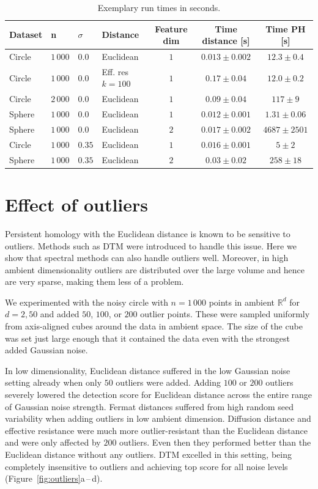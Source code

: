 \documentclass{article}
\theoremstyle{plain}
\theoremstyle{definition}
\theoremstyle{remark}
\begin{document}
\begin{table}[t]
    \centering
    \caption{Exemplary run times in seconds.}
    \begin{tabular}{llllccc}
        \toprule
         Dataset& n&$\sigma$& Distance & Feature dim& Time distance [s] & Time PH [s]\\
         \midrule
         Circle &$1\,000$ & $0.0$ & Euclidean & $1$ & $0.013\pm 0.002$ & $12.3 \pm 0.4$\\
         Circle &$1\,000$& $0.0$ & Eff. res $k=100$ & $1$ & $0.17\pm 0.04$ & $12.0\pm0.2$\\
         Circle &$2\,000$& $0.0$  & Euclidean & $1$ & $0.09\pm0.04$ & $117\pm 9$\\
         Sphere &$1\,000$& $0.0$ & Euclidean & $1$ & $0.012\pm0.001$ & $1.31\pm0.06$\\
         Sphere &$1\,000$& $0.0$ & Euclidean & $2$ & $0.017\pm0.002$ & $4687\pm2501$\\
         Circle &$1\,000$ & $0.35$ & Euclidean & $1$ & $0.016\pm 0.001$ & $5 \pm 2$\\
         Sphere &$1\,000$ & $0.35$ & Euclidean & $2$ & $0.03\pm 0.02$ & $258 \pm 18$\\
         \bottomrule
    \end{tabular}

    \label{tab:run_times}
\end{table}

\section{Effect of outliers}
\label{sec:outliers}
Persistent homology with the Euclidean distance is known to be sensitive to outliers. Methods such as DTM were introduced to handle this issue. Here we show that spectral methods can also handle outliers well. Moreover, in high ambient dimensionality outliers are distributed over the large volume and hence are very sparse, making them less of a problem.

We experimented with the noisy circle with $n=1\,000$ points in ambient $\mathbb R^d$ for $d=2, 50$ and added $50$, $100$, or $200$ outlier points. These were sampled uniformly from axis-aligned cubes around the data in ambient space. The size of the cube was set just large enough that it contained the data even with the strongest added Gaussian noise. 

In low dimensionality, Euclidean distance suffered in the low Gaussian noise setting already when only $50$ outliers were added.
Adding $100$ or $200$ outliers severely lowered the detection score for Euclidean distance across the entire range of Gaussian noise strength. Fermat distances suffered from high random seed variability when adding outliers in low ambient dimension. Diffusion distance and effective resistance were much more outlier-resistant than the Euclidean distance and were only affected by $200$ outliers. Even then they performed better than the Euclidean distance without any outliers. DTM excelled in this setting, being completely insensitive to outliers and achieving top score for all noise levels (Figure~\ref{fig:outliers}a\,--\,d). 
\end{document}
